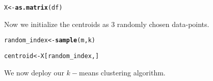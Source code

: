 \documentclass[11pt, a4paper]{article}\usepackage[]{graphicx}\usepackage[]{xcolor}
\makeatletter
\newcommand{\hldef}[1]{\textcolor[rgb]{0.345,0.345,0.345}{#1}}%
\newcommand{\hlkwb}[1]{\textcolor[rgb]{0.69,0.353,0.396}{#1}}%
\newcommand{\hlkwd}[1]{\textcolor[rgb]{0.737,0.353,0.396}{\textbf{#1}}}%
\newenvironment{kframe}{%
 \def\at@end@of@kframe{}%
 \ifinner\ifhmode%
  \def\at@end@of@kframe{\end{minipage}}%
  \begin{minipage}{\columnwidth}%
 \fi\fi%
 \def\FrameCommand##1{\hskip\@totalleftmargin \hskip-\fboxsep
 \colorbox{shadecolor}{##1}\hskip-\fboxsep
     \hskip-\linewidth \hskip-\@totalleftmargin \hskip\columnwidth}%
 \MakeFramed {\advance\hsize-\width
   \@totalleftmargin\z@ \linewidth\hsize
   \@setminipage}}%
 {\par\unskip\endMakeFramed%
 \at@end@of@kframe}
\newenvironment{knitrout}{}{} %
\makeatother
\begin{document}
\begin{knitrout}
\color{fgcolor}\begin{kframe}
\begin{alltt}
\hldef{X} \hlkwb{<-} \hlkwd{as.matrix}\hldef{(df)}
\end{alltt}
\end{kframe}
\end{knitrout}

Now we initialize the centroids as 3 randomly chosen data-points.

\begin{knitrout}
\color{fgcolor}\begin{kframe}
\begin{alltt}
\hldef{random_index} \hlkwb{<-} \hlkwd{sample}\hldef{(m, k)}

\hldef{centroid} \hlkwb{<-} \hldef{X[random_index, ]}
\end{alltt}
\end{kframe}
\end{knitrout}

We now deploy our $k-$means clustering algorithm.
\end{document}
